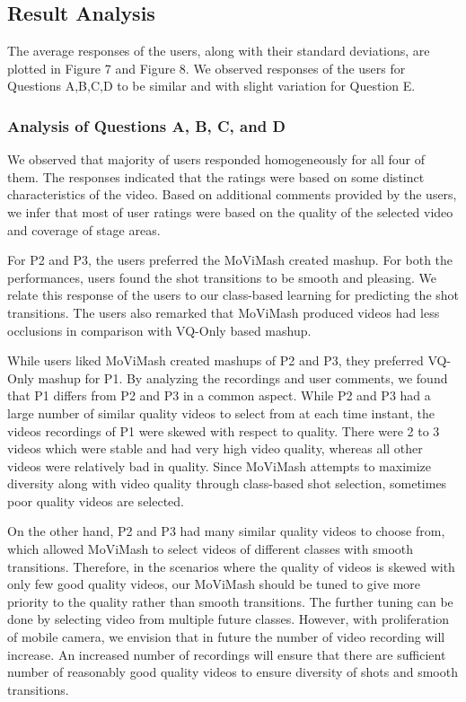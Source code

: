 \documentclass{new}
\begin{document}
\subsection{Result Analysis}
The average responses of the users, along with their standard
deviations, are plotted in  Figure 7 and  Figure 8. We observed responses
of the users for Questions A,B,C,D to be similar and with
slight variation for Question E.
\subsubsection{Analysis of Questions A, B, C, and D}
We observed that majority of users responded homogeneously
for all four of them. The responses indicated that the ratings were
based on some distinct characteristics of the video. Based on additional
comments provided by the users, we infer that most of user
ratings were based on the quality of the selected video and coverage
of stage areas.

For P2 and P3, the users preferred the MoViMash created mashup.
For both the performances, user\textquotesingle s found the shot transitions to be smooth and pleasing. We relate this response of the user\textquotesingle s to our class-based learning for predicting the shot transitions. The users also remarked that MoViMash produced videos had less occlusions in comparison with VQ-Only based mashup.

While users liked MoViMash created mashups of P2 and P3,
they preferred VQ-Only mashup for P1. By analyzing the recordings
and user comments, we found that P1 differs from P2 and P3 in
a common aspect. While P2 and P3 had a large number of similar
quality videos to select from at each time instant, the videos recordings
of P1 were skewed with respect to quality. There were 2 to 3
videos which were stable and had very high video quality, whereas
all other videos were relatively bad in quality. Since MoViMash
attempts to maximize diversity along with video quality through
class-based shot selection, sometimes poor quality videos are selected.

On the other hand, P2 and P3 had many similar quality videos
to choose from, which allowed MoViMash to select videos of different
classes with smooth transitions. Therefore, in the scenarios
where the quality of videos is skewed with only few good quality
videos, our MoViMash should be tuned to give more priority to
the quality rather than smooth transitions. The further tuning can
be done by selecting video from multiple future classes. However,
with proliferation of mobile camera, we envision that in future the
number of video recording will increase. An increased number of
recordings will ensure that there are sufficient number of reasonably
good quality videos to ensure diversity of shots and smooth
transitions.
\end{document}

